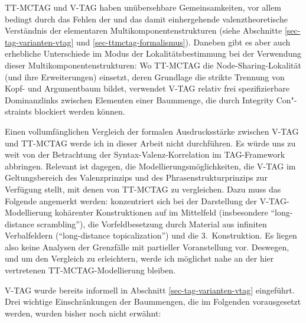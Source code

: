 TT-MCTAG und V-TAG haben unübersehbare Gemeinsamkeiten, vor allem bedingt durch das Fehlen der  und das damit einhergehende valenztheoretische Verständnis der elementaren Multikomponentenstrukturen (siehe Abschnitte \ref{sec-tag-varianten-vtag} und \ref{sec-ttmctag-formalismus}). Daneben gibt es aber auch erhebliche Unterschiede im Modus der Lokalitätsbestimmung bei der Verwendung dieser Multikomponentenstrukturen: Wo TT-MCTAG die Node-Sharing-Lokalität (und ihre Erweiterungen) einsetzt, deren Grundlage die strikte Trennung von Kopf- und Argumentbaum bildet, verwendet V-TAG relativ frei spezifizierbare Dominanzlinks zwischen Elementen einer Baummenge, die durch Integrity Con"-straints blockiert werden können. 

Einen vollumfänglichen Vergleich der formalen Ausdrucksstärke zwischen V-TAG und TT-MCTAG werde ich in dieser Arbeit nicht durchführen. Es würde uns zu weit von der Betrachtung der Syntax-Valenz-Korrelation im TAG-Framework abbringen. Relevant ist dagegen, die Modellierungsmöglichkeiten, die V-TAG im Geltungsbereich des Valenzprinzips und des Phrasenstrukturprinzips zur Verfügung stellt, mit denen von TT-MCTAG zu vergleichen. 
Dazu muss das Folgende angemerkt werden: \cite{Rambow:94} konzentriert sich bei der Darstellung der V-TAG-Modellierung kohärenter Konstruktionen auf  im Mittelfeld (insbesondere "`long-distance scrambling"'), die Vorfeldbesetzung durch Material aus infiniten Verbalfeldern ("`long-distance topicalization"') und die 3.~Konstruktion. Es liegen also keine Analysen der Grenzfälle mit partieller Voranstellung vor. Deswegen, und um den Vergleich zu erleichtern, werde ich möglichst nahe an der hier vertretenen TT-MCTAG-Modellierung bleiben.     

V-TAG wurde bereits informell in Abschnitt \ref{sec-tag-varianten-vtag} eingeführt. Drei wichtige Einschränkungen der Baummengen, die im Folgenden vorausgesetzt werden, wurden bisher noch nicht erwähnt: 

